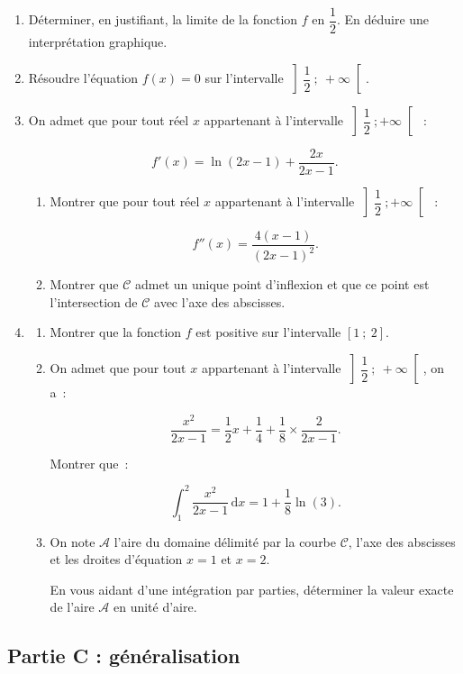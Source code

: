 \documentclass[10pt]{article}
\begin{document}
\begin{enumerate}
\item Déterminer, en justifiant, la limite de la fonction $f$ en $\dfrac{1}{2}$. En déduire une interprétation graphique.
\item Résoudre l'équation $f(x) = 0$ sur l'intervalle $\left]\dfrac{1}{2}~;~+\infty\right[$.
\item On admet que pour tout réel $x$ appartenant à l'intervalle $\left]\dfrac{1}{2}~;+\infty\right[$~:

\[f'(x) = \ln(2x-1) + \dfrac{2x}{2x-1}.\]

	\begin{enumerate}[label=\textbf{\alph*.}]
		\item Montrer que pour tout réel $x$ appartenant à l'intervalle $\left]\dfrac{1}{2}~;+\infty\right[$~:

\[f''(x) = \dfrac{4(x-1)}{(2x-1)^2}.\]

		\item Montrer que $\mathcal{C}$ admet un unique point d'inflexion et que ce point est l'intersection de $\mathcal{C}$ avec l'axe des abscisses.
	\end{enumerate}
\item
	\begin{enumerate}[label=\textbf{\alph*.}]
		\item Montrer que la fonction $f$ est positive sur l'intervalle $[1~;~2]$.
		\item On admet que pour tout $x$ appartenant à l'intervalle $\left]\dfrac{1}{2}~;~+\infty\right[$, on a~:
		
\[\dfrac{x^2}{2x-1} = \dfrac{1}{2}x + \dfrac{1}{4} + \dfrac{1}{8}\times\dfrac{2}{2x-1}.\]

Montrer que~:

\[\displaystyle\int_{1}^{2} \dfrac{x^2}{2x-1}\, \text{d}x = 1 + \dfrac{1}{8}\ln (3).\]

\item On note $\mathcal{A}$ l'aire du domaine délimité par la courbe $\mathcal{C}$, l'axe des abscisses et les droites d'équation $x=1$ et $x=2$.

En vous aidant d'une intégration par parties, déterminer la valeur exacte de l'aire $\mathcal{A}$ en unité d'aire.
	\end{enumerate}
\end{enumerate}


\subsection*{Partie C : généralisation}
\end{document}
